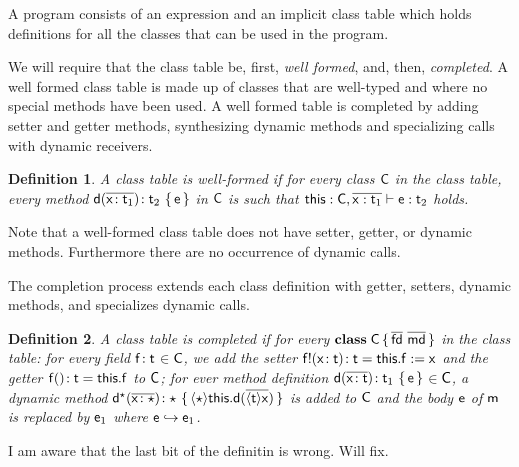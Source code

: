 \documentclass[preprint]{sigplanconf}
\newcommand{\fd}{\M{\xt{fd}}}
\newcommand{\md}{\M{\xt{md}}}
\newcommand{\m}{\M{\xt{m}}}
\newcommand{\e}{\M{\xt{e}}}
\renewcommand{\d}{\M{\xt{d}}}
\newcommand{\f}{\M{\xt{f}}}
\newcommand{\x}{\M{\xt{x}}}
\renewcommand{\t}{\M{\xt{t}}}
\newcommand{\C}{\M{\xt{C}}}
\newcommand{\this}{\M{\xt{this}}}
\renewcommand{\d}{\M{\xt{d}}}
\newcommand{\tp}[1]{\M{ \t_{#1} }}
\newcommand{\ep}[1]{\M{ \e_{#1} }}
\newcommand{\Get}[2]{\M{#1.#2}}
\newcommand{\Set}[3]{\M{#1.#2:=#3}}
\newcommand{\Call}[3]{\M{#1.#2(#3)}}
\newcommand{\Cast}[2]{\M{\langle{#1}\rangle{#2}}}
\newcommand{\any}{\M{\star}}
\newcommand{\HT}[2]{\M{{#1}\!:{#2}}}
\newcommand{\Mdef}[5]{\M{ \HT { #1( \b{\HT{#2}{#3}})}{#4}~ \{\, {#5} \,\} }}
\newcommand{\SMdef}[5]{\M{ \HT { #1!( \HT{#2}{#3})}{#4}= {#5}}}
\newcommand{\GMdef}[3]{\M{ \HT { #1()}{#2}={#3}}}
\newcommand{\Ftype}[2]{\M{ \HT{#1}{#2} }}
\newcommand{\Class}[3]{\M{\bt{class}\;#1\,\{\, #2 ~ #3\, \}}}
\newcommand{\M}[1]{\ensuremath{#1}\xspace}
\newcommand{\xt}[1]{{\sf{#1}}\xspace}
\newcommand{\bt}[1]{\xt{\bf #1}}
\renewcommand{\b}[1]{\M{\overline{#1}}}
\newcommand{\inc}{\M{\in}}
\newcommand{\EnvType}[3]{ \M{#1 \vdash #2 : #3}}
\newcommand{\TransClass}[2]{\M{ #1 \hookrightarrow #2 }}
\newcommand{\Dyn}[1]{\M{#1^{\any} }}
\begin{document}


\newtheorem{definition}{Definition}
\newcommand{\WF}[1]{\ensuremath{\xt{WF}(#1)}\xspace}

A program consists of an expression and an implicit class table which holds
definitions for all the classes that can be used in the program.

We will require that the class table be, first, \emph{well formed}, and,
then, \emph{completed}.  A well formed class table is made up of classes
that are well-typed and where no special methods have been used.  A well
formed table is completed by adding setter and getter methods, synthesizing
dynamic methods and specializing calls with dynamic receivers.

\begin{definition} A class table is well-formed if for every class \C  in
the class table, every method \Mdef\d\x{\tp1}{\tp2}\e in \C is such that
\EnvType{\this:\C,\b{\x:\tp1}}\e{\tp2} holds.
\end{definition}

Note that a well-formed class table does not have setter, getter, or dynamic
methods. Furthermore there are no occurrence of dynamic calls.

The completion process extends each class definition with getter, setters,
dynamic methods, and specializes dynamic calls.

\begin{definition} A class table is completed if for every 
 \Class \C {\b{\fd}} {\b{\md}} in the class table: for every field
 \Ftype\f\t\inc\C, we add the setter \SMdef\f\x\t\t{\Set\this\f\x} and the
 getter \GMdef\f\t{\Get\this\f} to \C; for ever method definition
 \Mdef\d\x\t{\tp1}\e\inc\C, a dynamic method \Mdef{\Dyn\d}\x\any\any{
   \Cast\any{\Call\this\d{\b{\Cast\t\x }} }} is added to \C and the body \e of
 \m is replaced by  \ep1 where \TransClass\e{\ep1}.
\end{definition}

I am aware that the last bit of the definitin is wrong. Will fix.
\end{document}
